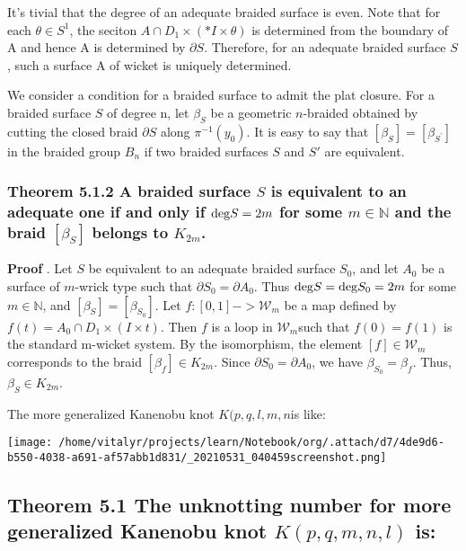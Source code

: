 \documentclass[a4paper]{article}
\begin{document}
It's tivial that the degree of an adequate braided surface is even. Note that for each \(\theta \in S^{1}\), the seciton \(A \cap  D_{1} \times (*I \times {\theta})\)  is determined from the boundary of A and hence A is determined by \(\partial S\). Therefore, for an adequate braided surface \(S\), such a surface A of wicket is uniquely determined.

We consider a condition for a braided surface to admit the plat closure. For a
braided surface \(S\) of degree n, let \(\beta_{S}\) be a geometric \(n\)-braided obtained by cutting the closed braid \(\partial S\) along \(\pi ^{-1}(y_{0})\). It is easy to say that \([\beta_{S}] = [\beta_{S^{'}}]\) in the braided group \(B_{n}\) if two braided surfaces \(S\) and \(S'\) are equivalent.
\subsubsection{Theorem 5.1.2 A braided surface \(S\) is equivalent to an adequate one if and only if \({\rm deg} S = 2m\) for some \(m \in \mathbb{N}\) and the braid \([\beta_{S}]\) belongs to \(K_{2m}\).}
\label{sec:org8559573}
\textbf{Proof} . Let \(S\) be equivalent to an adequate braided surface \(S_{0}\), and let \(A_{0}\) be a surface of \(m\)-wrick type such that \(\partial S_{0} = \partial A_{0}\). Thus \({\rm deg} S = {\rm deg } S_{0} = 2m\) for some \(m \in \mathbb{N}\), and \([\beta_{S}]=[\beta_{S_{0}}]\). Let \(f:[0,1] -> \mathscr{W}_{m}\) be a map defined by \(f(t) = A_{0} \cap D_{1} \times (I \times {t})\). Then \(f\) is a loop in \(\mathscr{W}_{m}\)such that \(f(0) = f(1)\) is the standard m-wicket system. By the isomorphism, the element \([f] \in \mathscr{W}_{m}\) corresponds to the braid \([\beta_{f}] \in K_{2m}\). Since \(\partial S_{0} = \partial A_{0}\), we have \(\beta_{S_{0}} = \beta_{f}\). Thus, \(\beta_{S} \in K_{2m}\).

The more generalized Kanenobu knot \(K(p, q, l, m, n\)is like:

\begin{center}
\texttt{[image: /home/vitalyr/projects/learn/Notebook/org/.attach/d7/4de9d6-b550-4038-a691-af57abb1d831/\_20210531\_040459screenshot.png]}
\end{center}


\subsection{Theorem 5.1 The unknotting number for more generalized Kanenobu knot \(K(p, q, m, n, l)\) is:}
\label{sec:orgefaff49}
\end{document}
